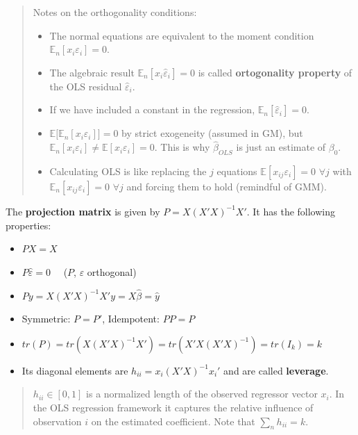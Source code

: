 \documentclass[12pt,]{book}
\providecommand{\tightlist}{%
  \setlength{\itemsep}{0pt}\setlength{\parskip}{0pt}}
\begin{document}
\begin{quote}
Notes on the orthogonality conditions:

\begin{itemize}
\tightlist
\item
  The normal equations are equivalent to the moment condition \(\mathbb E_n [x_i \varepsilon_i]= 0\).
\item
  The algebraic result \(\mathbb E_n [x_i \hat \varepsilon_i]= 0\) is called \textbf{ortogonality property} of the OLS residual \(\hat \varepsilon_i\).
\item
  If we have included a constant in the regression, \(\mathbb E_n [\hat \varepsilon_i] = 0\).
\item
  \(\mathbb E \Big[\mathbb E_n [x_i \varepsilon_i ] \Big] = 0\) by strict exogeneity (assumed in GM), but \(\mathbb E_n [x_i \varepsilon_i] \ne \mathbb E [x_i \varepsilon_i] = 0\). This is why \(\hat \beta _ {OLS}\) is just an estimate of \(\beta_0\).
\item
  Calculating OLS is like replacing the \(j\) equations \(\mathbb E [x _ {ij} \varepsilon_i] = 0\) \(\forall j\) with \(\mathbb E_n [x _ {ij} \varepsilon_i] = 0\) \(\forall j\) and forcing them to hold (remindful of GMM).
\end{itemize}
\end{quote}

The \textbf{projection matrix} is given by \(P = X(X'X)^{-1} X'\). It has the following properties:

\begin{itemize}
\tightlist
\item
  \(PX = X\)
\item
  \(P \hat \varepsilon = 0 \quad\) (\(P\), \(\varepsilon\) orthogonal)
\item
  \(P y = X(X'X)^{-1} X'y = X\hat \beta = \hat y\)
\item
  Symmetric: \(P=P'\), Idempotent: \(PP = P\)
\item
  \(tr(P) = tr( X(X'X)^{-1} X') = tr( X'X(X'X)^{-1}) = tr(I_k) = k\)
\item
  Its diagonal elements are \(h_{ii} = x_i (X'X)^{-1} x_i'\) and are called \textbf{leverage}.
\end{itemize}

\begin{quote}
\(h _ {ii} \in [0,1]\) is a normalized length of the observed regressor vector \(x_i\). In the OLS regression framework it captures the relative influence of observation \(i\) on the estimated coefficient. Note that \(\sum _ n h_{ii} = k\).
\end{quote}
\end{document}
